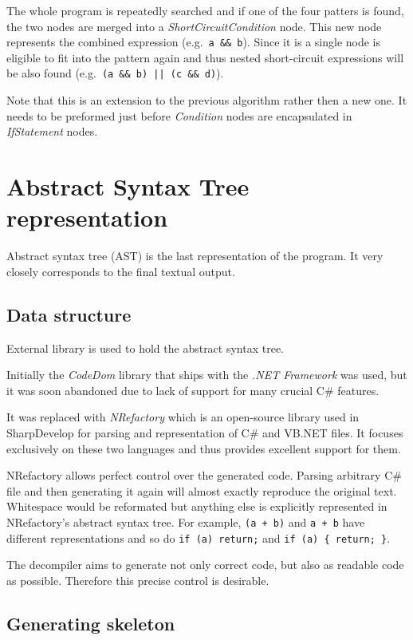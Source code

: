 \documentclass[12pt,twoside,notitlepage]{report}
\begin{document}
The whole program is repeatedly searched and if one of the four patters 
is found, the two nodes are merged into a \emph{ShortCircuitCondition} node.
This new node represents the combined expression (e.g.\ \verb|a && b|).
Since it is a single node is eligible to fit into the pattern
again and thus nested short-circuit expressions will be also
found (e.g.\ \verb/(a && b) || (c && d)/).

Note that this is an extension to the previous algorithm rather
then a new one.  It needs to be preformed just before 
\emph{Condition} nodes are encapsulated in \emph{IfStatement} nodes.


\section{Abstract Syntax Tree representation}
  \label{Abstract Syntax Tree representation}

Abstract syntax tree (AST) is the last representation of the program.
It very closely corresponds to the final textual output.

\subsection{Data structure}

External library is used to hold the abstract syntax tree.

Initially the \emph{CodeDom} library that ships with the
\emph{.NET Framework} was used, but it was soon abandoned due
to lack of support for many crucial C\# features.

It was replaced with \emph{NRefactory} which is an open-source 
library used in SharpDevelop for parsing and representation of 
C\# and VB.NET files.
It focuses exclusively on these two languages and
thus provides excellent support for them.

NRefactory allows perfect control over the generated code.
Parsing arbitrary C\# file and then generating it again
will almost exactly reproduce the original text.  Whitespace
would be reformated but anything else is explicitly represented
in NRefactory's abstract syntax tree.
For example,  \verb|(a + b)| and \verb|a + b| have 
different representations and so do \verb|if (a) return;| and 
\verb|if (a) { return; }|.

The decompiler aims to generate not only correct code, but also as
readable code as possible.  Therefore this precise control is desirable.


\subsection{Generating skeleton}
\end{document}
